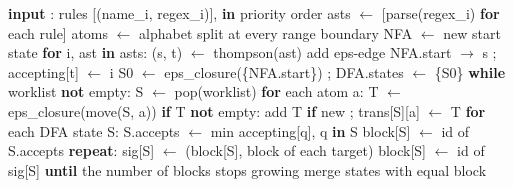 \documentclass{ieeeaccess}
\begin{document}
\begin{algorithm}[!tb]
\scriptsize
\caption{Regex to minimized DFA}\label{alg:2}
\begin{algorithmic}[1]
\State \hspace*{1.0em}\textbf{input} : rules [(name\_i, regex\_i)], \textbf{in} priority order
\State \hspace*{1.0em}asts  $\leftarrow$ [parse(regex\_i) \textbf{for} each rule]
\State \hspace*{1.0em}atoms $\leftarrow$ alphabet split at every range boundary
\State \hspace*{1.0em}NFA   $\leftarrow$ new start state
\State \hspace*{1.0em}\textbf{for} i, ast \textbf{in} asts:
\State \hspace*{2.0em}(s, t) $\leftarrow$ thompson(ast)
\State \hspace*{2.0em}add eps-edge NFA.start $\rightarrow$ s ; accepting[t] $\leftarrow$ i
\State \hspace*{1.0em}S0 $\leftarrow$ eps\_closure(\{NFA.start\}) ; DFA.states $\leftarrow$ \{S0\}
\State \hspace*{1.0em}\textbf{while} worklist \textbf{not} empty:
\State \hspace*{2.0em}S $\leftarrow$ pop(worklist)
\State \hspace*{2.0em}\textbf{for} each atom a:
\State \hspace*{3.0em}T $\leftarrow$ eps\_closure(move(S, a))
\State \hspace*{3.0em}\textbf{if} T \textbf{not} empty: add T \textbf{if} new ; trans[S][a] $\leftarrow$ T
\State \hspace*{1.0em}\textbf{for} each DFA state S:
\State \hspace*{2.0em}S.accepts $\leftarrow$ min accepting[q], q \textbf{in} S
\Statex {}
\State \hspace*{1.0em}block[S] $\leftarrow$ id of S.accepts
\State \hspace*{1.0em}\textbf{repeat}:
\State \hspace*{2.0em}sig[S] $\leftarrow$ (block[S], block of each target)
\State \hspace*{2.0em}block[S] $\leftarrow$ id of sig[S]
\State \hspace*{1.0em}\textbf{until} the number of blocks stops growing
\State \hspace*{1.0em}merge states with equal block
\end{algorithmic}
\end{algorithm}
\end{document}
